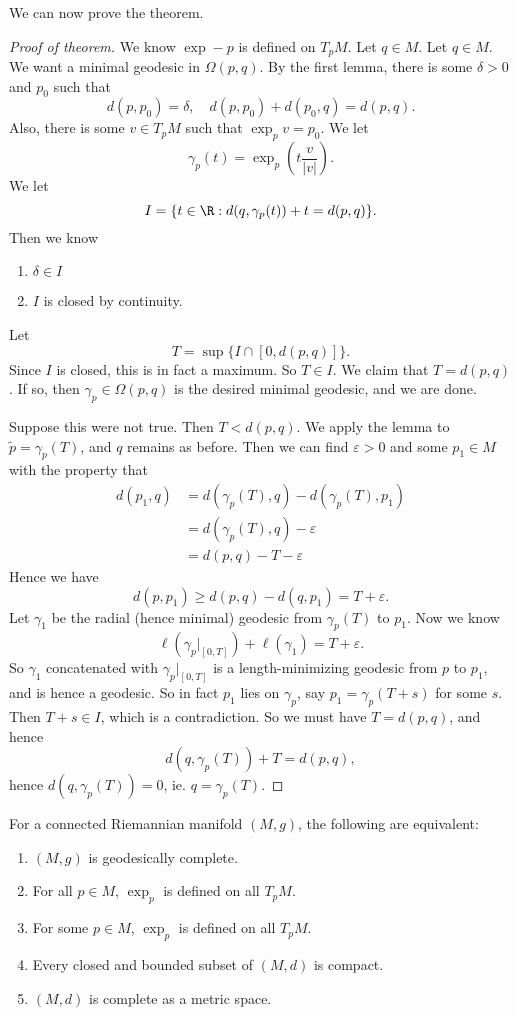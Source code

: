 \documentclass[a4paper]{article}
\begin{document}
We can now prove the theorem.
\begin{proof}[Proof of theorem]
  We know $\exp-p$ is defined on $T_p M$. Let $q \in M$. Let $q \in M$. We want a minimal geodesic in $\Omega(p, q)$. By the first lemma, there is some $\delta > 0$ and $p_0$ such that
  \[
    d(p, p_0) = \delta,\quad d(p, p_0) + d(p_0, q) = d(p, q).
  \]
  Also, there is some $v \in T_p M$ such that $\exp_p v = p_0$. We let
  \[
    \gamma_p (t) = \exp_p\left(t \frac{v}{|v|}\right).
  \]
  We let
  \[
    I = \{t \in \R: d(q, \gamma_p(t)) + t = d(p, q)\}.
  \]
  Then we know
  \begin{enumerate}
    \item $\delta \in I$
    \item $I$ is closed by continuity.
  \end{enumerate}
  Let
  \[
    T = \sup\{I \cap [0, d(p, q)]\}.
  \]
  Since $I$ is closed, this is in fact a maximum. So $T \in I$. We claim that $T = d(p, q)$. If so, then $\gamma_p \in \Omega(p, q)$ is the desired minimal geodesic, and we are done.

  Suppose this were not true. Then $T < d(p, q)$. We apply the lemma to $\tilde{p} = \gamma_p(T)$, and $q$ remains as before. Then we can find $\varepsilon > 0$ and some $p_1 \in M$ with the property that
  \begin{align*}
    d(p_1, q) &= d(\gamma_p(T), q) - d(\gamma_p(T), p_1) \\
    &= d(\gamma_p(T), q) - \varepsilon\\
    &= d(p, q) - T - \varepsilon
  \end{align*}
  Hence we have
  \[
    d(p, p_1) \geq d(p, q) - d(q, p_1) = T + \varepsilon.
  \]
  Let $\gamma_1$ be the radial (hence minimal) geodesic from $\gamma_p(T)$ to $p_1$. Now we know
  \[
    \ell(\gamma_p|_{[0, T]}) + \ell(\gamma_1) = T + \varepsilon.
  \]
  So $\gamma_1$ concatenated with $\gamma_p|_{[0, T]}$ is a length-minimizing geodesic from $p$ to $p_1$, and is hence a geodesic. So in fact $p_1$ lies on $\gamma_p$, say $p_1 = \gamma_p(T + s)$ for some $s$. Then $T + s \in I$, which is a contradiction. So we must have $T = d(p, q)$, and hence
  \[
    d(q, \gamma_p(T)) + T = d(p, q),
  \]
  hence $d(q, \gamma_p(T)) = 0$, ie. $q = \gamma_p(T)$.
\end{proof}

\begin{cor}
  For a connected Riemannian manifold $(M, g)$, the following are equivalent:
  \begin{enumerate}
    \item $(M, g)$ is geodesically complete.
    \item For all $p \in M$, $\exp_p$ is defined on all $T_p M$.
    \item For some $p \in M$, $\exp_p$ is defined on all $T_p M$.
    \item Every closed and bounded subset of $(M, d)$ is compact.
    \item $(M, d)$ is complete as a metric space.
  \end{enumerate}
\end{cor}
\end{document}
